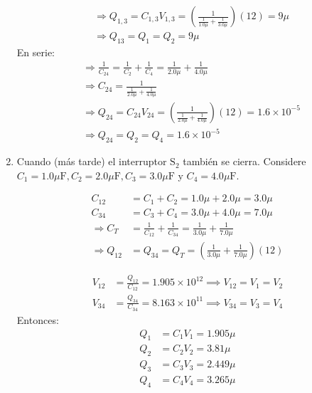 \begin{problema}
\begin{enumerate}
\begin{sol}
$$
\begin{aligned}
& \Rightarrow Q_{1,3}=C_{1,3} V_{1,3}=\left(\frac{1}{\frac{1}{1.0 \mu}+\frac{1}{3.0\mu}}\right)(12)= 9\mu \\
& \Rightarrow Q_{13}=Q_{1}=Q_{2}= 9\mu 
\end{aligned}
$$
En serie:
$$
\begin{aligned}
&\Rightarrow  \frac{1}{C_{24}}=\frac{1}{C_{2}}+\frac{1}{C_{4}}=\frac{1}{2.0 \mu}+\frac{1}{4.0 \mu} \\
& \Rightarrow C_{24}=\frac{1}{\frac{1}{2.0 \mu}+\frac{1}{4.0 \mu}} \\
& \Rightarrow Q_{24}=C_{24} V_{24}=\left(\frac{1}{\frac{1}{2.0 \mu}+\frac{1}{4.0 \mu}}\right)(12)= 1.6\times 10^{-5}\\
& \Rightarrow Q_{24}=Q_{2}=Q_{4}=1.6\times 10^{-5}
\end{aligned}
$$
        \end{sol}
        \item Cuando (más tarde) el interruptor $\mathrm{S}_{2}$ también se cierra. Considere $C_{1}=1.0 \mu \mathrm{F}, C_{2}=2.0 \mu \mathrm{F}, C_{3}=3.0 \mu \mathrm{F}$ y $C_{4}=4.0 \mu \mathrm{F}$.
        \begin{sol}
            $$
\begin{aligned}
C_{12} & =C_{1}+C_{2}=1.0 \mu+2.0 \mu=3.0 \mu \\
C_{34} & =C_{3}+C_{4}=3.0\mu+4.0\mu=7.0 \mu \\
\Rightarrow C_{T} & =\frac{1}{C_{12}}+\frac{1}{C_{34}}=\frac{1}{3.0 \mu}+\frac{1}{7.0 \mu}\\
\Rightarrow Q_{12} & =Q_{34}=Q_{T}=\left(\frac{1}{3.0 \mu}+\frac{1}{7.0 \mu}\right)(12)
\end{aligned}
$$


\begin{align*}
    V_{12} &= \frac{Q_{12}}{C_{12}} = 1.905\times 10^{12}\implies V_{12}=V_1=V_2\\
    V_{34} &= \frac{Q_{34}}{C_{34}} = 8.163\times 10^{11}\implies V_{34}=V_3=V_4
\end{align*}
Entonces: 
\begin{align*}
    Q_1 &= C_1V_1=1.905\mu \\
    Q_2 &= C_2V_2=3.81\mu\\
    Q_3 &= C_3V_3=2.449\mu\\
    Q_4 &= C_4V_4=3.265\mu\\
\end{align*}
        \end{sol}
    \end{enumerate}
    
\end{problema}


